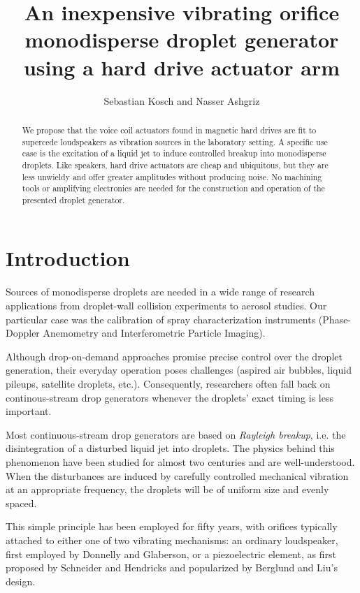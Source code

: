 \documentclass[aip,rsi,reprint,graphicx]{revtex4-1} %
\begin{document}
\title{An inexpensive vibrating orifice monodisperse droplet generator using a hard
drive actuator arm}
\author{Sebastian Kosch and Nasser Ashgriz}
\begin{abstract}
    We propose that the voice coil actuators found in magnetic hard drives are
    fit to supercede loudspeakers as vibration sources in the laboratory setting. A
    specific use case is the excitation of a liquid jet to induce controlled
    breakup into monodisperse droplets. Like speakers, hard drive actuators are cheap and
    ubiquitous, but they are less unwieldy and offer greater amplitudes without
    producing noise. No machining tools or amplifying electronics
    are needed for the construction and operation of the presented droplet generator.
\end{abstract}
\maketitle
\section{Introduction}
Sources of monodisperse droplets are needed in a wide range of research
applications from droplet-wall collision experiments\cite{Mundo95} to aerosol
studies\cite{Liu74}. Our particular case was the calibration of spray
characterization instruments (Phase-Doppler Anemometry and Interferometric
Particle Imaging).

Although drop-on-demand approaches promise precise control over the droplet
generation, their everyday operation poses challenges (aspired air bubbles,
liquid pileups, satellite droplets, etc.). Consequently, researchers often fall
back on continous-stream drop generators whenever the droplets' exact timing is
less important.

Most continuous-stream drop generators are based on \emph{Rayleigh breakup},
i.e. the disintegration of a disturbed liquid jet into droplets. The physics
behind this phenomenon have been studied for almost two centuries\cite{Savart33,
Rayleigh79} and are well-understood. When the disturbances are induced by
carefully controlled mechanical vibration at an appropriate frequency, the
droplets will be of uniform size and evenly spaced.

This simple principle has been employed for fifty years, with orifices typically
attached to either one of two vibrating mechanisms: an ordinary loudspeaker,
first employed by Donnelly and Glaberson\cite{Donnelly66}, or a piezoelectric
element, as first proposed by Schneider and Hendricks\cite{Schneider64} and
popularized by Berglund and Liu's design\cite{Berglund73}.
\end{document}
